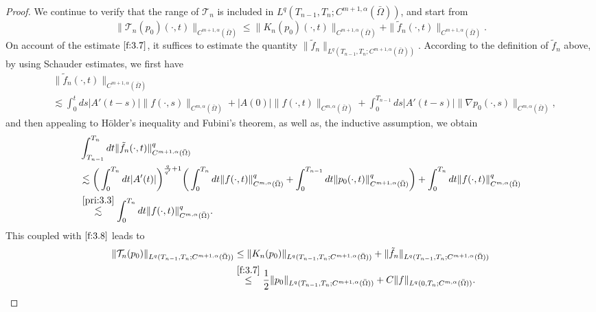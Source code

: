 \documentclass[13pt,CJK]{article}
\theoremstyle{plain}                       %
\theoremstyle{remark}
\numberwithin{equation}{section}
\begin{document}
\begin{proof}
We continue to verify that the range of $\mathcal{T}_n$ is included in $L^q(T_{n-1},T_n;C^{m+1,\alpha}(\bar\Omega))$, and start from
\begin{equation*}
\|\mathcal{T}_n(p_0)(\cdot,t)\|_{C^{m+1,\alpha}(\bar\Omega)}
\leq \|K_n(p_0)(\cdot,t)\|_{C^{m+1,\alpha}(\bar\Omega)}+
\|\tilde{f}_n(\cdot,t)\|_{C^{m+1,\alpha}(\bar\Omega)}.
\end{equation*}
On account of the estimate $\eqref{f:3.7}$, it suffices to estimate
the quantity $\|\tilde{f}_n\|_{L^q(T_{n-1},T_n;C^{m+1,\alpha}(\bar\Omega))}$.
According to the definition of $\tilde{f}_n$ above,
by using Schauder estimates, we first have
\begin{equation*}
\begin{aligned}
&\|\tilde{f}_n(\cdot,t)\|_{C^{m+1,\alpha}(\bar\Omega)}\\
&\lesssim
\int_{0}^{t}ds|A'(t-s)|
\|f(\cdot,s)\|_{C^{m,\alpha}(\bar\Omega)}
+|A(0)|\|f(\cdot,t)\|_{C^{m,\alpha}(\bar\Omega)}
+\int_{0}^{T_{n-1}}ds|A'(t-s)|
\|\nabla p_0(\cdot,s)\|_{C^{m,\alpha}(\bar\Omega)},
\end{aligned}
\end{equation*}
and then appealing to H\"older's inequality and Fubini's theorem, as well as, the inductive assumption, we obtain
\begin{equation*}\label{rh11}
\begin{aligned}
&\int_{T_{n-1}}^{T_n}dt\|\tilde{f}_n(\cdot,t)
\|^q_{C^{m+1,\alpha}(\bar\Omega)} \\
&\lesssim\bigg(
\int_{0}^{T_n}dt|A'(t)|\bigg)^{\frac{q}{q'}+1}
\bigg(\int_{0}^{T_n}dt\|f(\cdot,t)
\|^q_{C^{m,\alpha}(\bar\Omega)}
+\int_{0}^{T_{n-1}}dt\|p_0(\cdot,t)\|^q_{C^{m+1,\alpha}(\bar\Omega)}\bigg)
+\int_{0}^{T_n}dt\|f(\cdot,t)
\|^q_{C^{m,\alpha}(\bar\Omega)}\\
&\overset{\eqref{pri:3.3}}{\lesssim}\int_{0}^{T_n}dt\|f(\cdot,t)
\|^q_{C^{m,\alpha}(\bar\Omega)}.
\end{aligned}
\end{equation*}
This coupled with $\eqref{f:3.8}$ leads to
\begin{equation*}
\begin{aligned}
\|\mathcal{T}_n(p_0)\|_{L^q(T_{n-1},T_n;C^{m+1,\alpha}(\bar\Omega))}
&\leq \|K_n(p_0)\|_{L^q(T_{n-1},T_n; C^{m+1,\alpha}(\bar\Omega))}
+\|\tilde{f}_n\|_{L^q(T_{n-1},T_n; C^{m+1,\alpha}(\bar\Omega))}\\
&\overset{\eqref{f:3.7}}{\leq} \frac{1}{2}\|p_0\|_{L^q(T_{n-1},T_n; C^{m+1,\alpha}(\bar\Omega))}
+ C\|f\|_{L^q(0,T_n; C^{m,\alpha}(\bar\Omega))}.
\end{aligned}
\end{equation*}


\end{proof}
\end{document}
